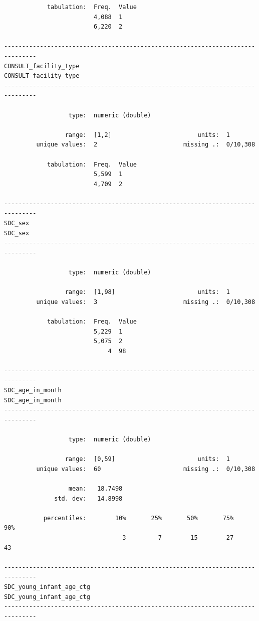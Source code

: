\documentclass[
  letterpaper,
  DIV=11,
  numbers=noendperiod]{scrreprt}
\begin{document}
\begin{verbatim}
            tabulation:  Freq.  Value
                         4,088  1
                         6,220  2

-------------------------------------------------------------------------------
CONSULT_facility_type                                     CONSULT_facility_type
-------------------------------------------------------------------------------

                  type:  numeric (double)

                 range:  [1,2]                        units:  1
         unique values:  2                        missing .:  0/10,308

            tabulation:  Freq.  Value
                         5,599  1
                         4,709  2

-------------------------------------------------------------------------------
SDC_sex                                                                 SDC_sex
-------------------------------------------------------------------------------

                  type:  numeric (double)

                 range:  [1,98]                       units:  1
         unique values:  3                        missing .:  0/10,308

            tabulation:  Freq.  Value
                         5,229  1
                         5,075  2
                             4  98

-------------------------------------------------------------------------------
SDC_age_in_month                                               SDC_age_in_month
-------------------------------------------------------------------------------

                  type:  numeric (double)

                 range:  [0,59]                       units:  1
         unique values:  60                       missing .:  0/10,308

                  mean:   18.7498
              std. dev:   14.8998

           percentiles:        10%       25%       50%       75%       90%
                                 3         7        15        27        43

-------------------------------------------------------------------------------
SDC_young_infant_age_ctg                               SDC_young_infant_age_ctg
-------------------------------------------------------------------------------


\end{verbatim}
\end{document}
